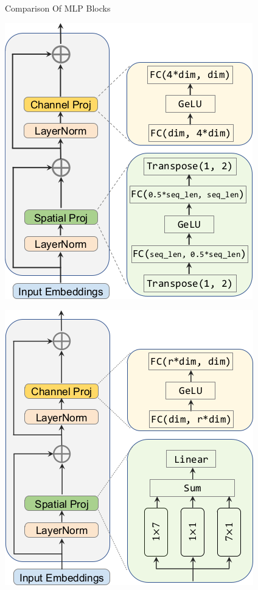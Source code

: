 \documentclass{beamer}
\begin{document}
\begin{frame}{Comparison Of MLP Blocks}
    \centering
    \parbox{.4\textwidth}{\centering \includegraphics[width=.4\textwidth]{figures/block_mlpmixer.png}}
    \parbox{.4\textwidth}{\centering \includegraphics[width=.4\textwidth]{figures/block_cyclemlp.png}}
\end{frame}
\end{document}
